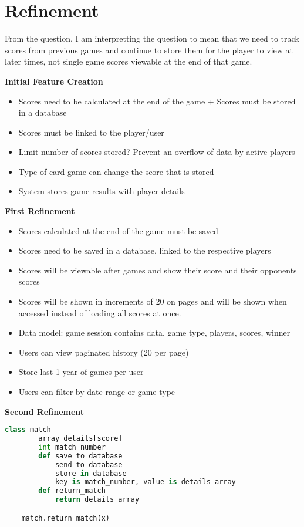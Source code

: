 \documentclass[12pt]{article}
\begin{document}
\maketitlepage

\section{Refinement}

From the question, I am interpretting the question to mean that we need to
track scores from previous games and continue to store them for the player to view
at later times, not single game scores viewable at the end of that game.

\textbf{Initial Feature Creation}
\begin{itemize}
    \item Scores need to be calculated at the end of the game + Scores must be stored in a database
    \item Scores must be linked to the player/user
    \item Limit number of scores stored? Prevent an overflow of data by active players
    \item Type of card game can change the score that is stored
    \item System stores game results with player details
\end{itemize}

\textbf{First Refinement}
\begin{itemize}
    \item Scores calculated at the end of the game must be saved
    \item Scores need to be saved in a database, linked to the respective players
    \item Scores will be viewable after games and show their score and their opponents scores
    \item Scores will be shown in increments of 20 on pages and will be shown when accessed instead of loading all scores at once.
    \item Data model: game session contains data, game type, players, scores, winner
    \item Users can view paginated history (20 per page)
    \item Store last 1 year of games per user
    \item Users can filter by date range or game type
\end{itemize}

\textbf{Second Refinement}
\begin{lstlisting}[language=Python]
    class match
        array details[score]
        int match_number
        def save_to_database
            send to database
            store in database
            key is match_number, value is details array
        def return_match
            return details array

    match.return_match(x)
\end{lstlisting}
\end{document}
